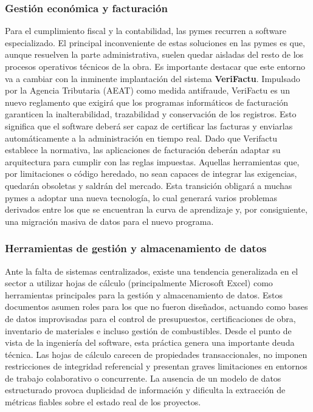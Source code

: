 \subsubsection{Gestión económica y facturación}
Para el cumplimiento fiscal y la contabilidad, las pymes recurren a software especializado. El principal inconveniente de estas soluciones en las pymes es que, aunque resuelven la parte administrativa, suelen quedar aisladas del resto de los procesos operativos técnicos de la obra. 
Es importante destacar que este entorno va a cambiar con la inminente implantación del sistema \textbf{VeriFactu}. Impulsado por la Agencia Tributaria (AEAT) como medida antifraude, VeriFactu es un nuevo reglamento que exigirá que los programas informáticos de facturación garanticen la inalterabilidad, trazabilidad y conservación de los registros. Esto significa que el software deberá ser capaz de certificar las facturas y enviarlas automáticamente a la administración en tiempo real. 
Dado que Verifactu establece la normativa, las aplicaciones de facturación deberán adaptar su arquitectura para cumplir con las reglas impuestas. Aquellas herramientas que, por limitaciones o código heredado, no sean capaces de integrar las exigencias, quedarán obsoletas y saldrán del mercado. Esta transición obligará a muchas pymes a adoptar una nueva tecnología, lo cual generará varios problemas derivados entre los que se encuentran la curva de aprendizaje y, por consiguiente, una migración masiva de datos para el nuevo programa.
\subsubsection{Herramientas de gestión y almacenamiento de datos}
Ante la falta de sistemas centralizados, existe una tendencia generalizada en el sector a utilizar hojas de cálculo (principalmente Microsoft Excel) como herramientas principales para la gestión y almacenamiento de datos. Estos documentos asumen roles para los que no fueron diseñados, actuando como bases de datos improvisadas para el control de presupuestos, certificaciones de obra, inventario de materiales e incluso gestión de combustibles. 
Desde el punto de vista de la ingeniería del software, esta práctica genera una importante deuda técnica. Las hojas de cálculo carecen de propiedades transaccionales, no imponen restricciones de integridad referencial y presentan graves limitaciones en entornos de trabajo colaborativo o concurrente. La ausencia de un modelo de datos estructurado provoca duplicidad de información y dificulta la extracción de métricas fiables sobre el estado real de los proyectos.
